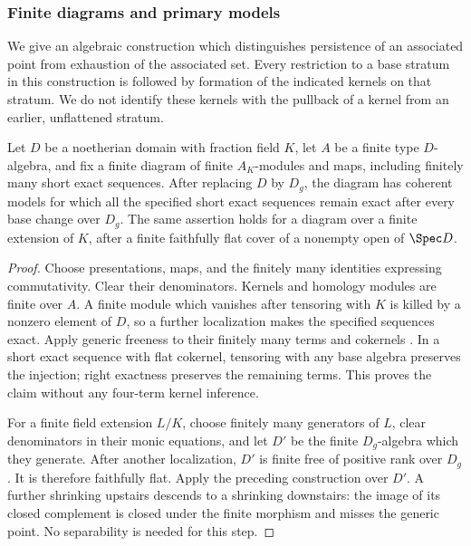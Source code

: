 \subsubsection{Finite diagrams and primary models}

We give an algebraic construction which distinguishes persistence of an
associated point from exhaustion of the associated set.  Every restriction
to a base stratum in this construction is followed by formation of the
indicated kernels on that stratum.  We do not identify these kernels with
the pullback of a kernel from an earlier, unflattened stratum.

\begin{lemma}\label{lem:finite-exact-diagram}
Let \(D\) be a noetherian domain with fraction field \(K\), let \(A\)
be a finite type \(D\)-algebra, and fix a finite diagram of finite
\(A_K\)-modules and maps, including finitely many short exact sequences.
After replacing \(D\) by \(D_g\), the diagram has coherent models for
which all the specified short exact sequences remain exact after every
base change over \(D_g\).  The same assertion holds for a diagram over
a finite extension of \(K\), after a finite faithfully flat cover of a
nonempty open of \(\Spec D\).
\end{lemma}
\begin{proof}
Choose presentations, maps, and the finitely many identities expressing
commutativity.  Clear their denominators.  Kernels and homology modules
are finite over \(A\).  A finite module which vanishes after tensoring
with \(K\) is killed by a nonzero element of \(D\), so a further
localization makes the specified sequences exact.  Apply generic
freeness to their finitely many terms and cokernels
\cite[Tag 051S]{StacksGenericFree}.  In a short exact sequence with
flat cokernel, tensoring with any base algebra preserves the injection;
right exactness preserves the remaining terms.  This proves the claim
without any four-term kernel inference.

For a finite field extension \(L/K\), choose finitely many generators
of \(L\), clear denominators in their monic equations, and let \(D'\)
be the finite \(D_g\)-algebra which they generate.  After another
localization, \(D'\) is finite free of positive rank over \(D_g\).
It is therefore faithfully flat.  Apply the preceding construction over
\(D'\).  A further shrinking upstairs descends to a shrinking downstairs:
the image of its closed complement is closed under the finite morphism
and misses the generic point.  No separability is needed for this step.
\end{proof}

